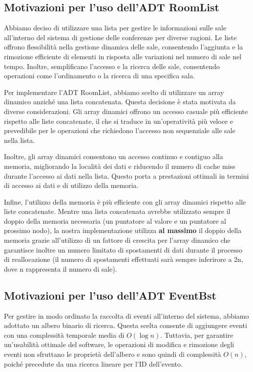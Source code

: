 \documentclass[11pt]{scrartcl} %
\begin{document}
\subsection{Motivazioni per l'uso dell'ADT RoomList}

Abbiamo deciso di utilizzare una lista per gestire le informazioni sulle sale all'interno del sistema di gestione delle conferenze per diverse ragioni. Le liste offrono flessibilità nella gestione dinamica delle sale, consentendo l'aggiunta e la rimozione efficiente di elementi in risposta alle variazioni nel numero di sale nel tempo. Inoltre, semplificano l'accesso e la ricerca delle sale, consentendo operazioni come l'ordinamento o la ricerca di una specifica sala.

Per implementare l'ADT RoomList, abbiamo scelto di utilizzare un array dinamico anziché una lista concatenata. Questa decisione è stata motivata da diverse considerazioni. Gli array dinamici offrono un accesso casuale più efficiente rispetto alle liste concatenate, il che si traduce in un'operatività più veloce e prevedibile per le operazioni che richiedono l'accesso non sequenziale alle sale nella lista.

Inoltre, gli array dinamici consentono un accesso continuo e contiguo alla memoria, migliorando la località dei dati e riducendo il numero di cache miss durante l'accesso ai dati nella lista. Questo porta a prestazioni ottimali in termini di accesso ai dati e di utilizzo della memoria.

Infine, l'utilizzo della memoria è più efficiente con gli array dinamici rispetto alle liste concatenate. Mentre una lista concatenata avrebbe utilizzato sempre il doppio della memoria necessaria (un puntatore al valore e un puntatore al prossimo nodo), la nostra implementazione utilizza \textbf{al massimo} il doppio della memoria grazie all'utilizzo di un fattore di crescita per l'array dinamico che garantisce inoltre un numero limitato di spostamenti di dati durante il processo di reallocazione (il numero di spostamenti effettuati sarà sempre inferirore a 2n, dove n rappresenta il numero di sale).


\subsection{Motivazioni per l'uso dell'ADT EventBst}
Per gestire in modo ordinato la raccolta di eventi all'interno del sistema, abbiamo adottato un albero binario di ricerca. Questa scelta consente di aggiungere eventi con una complessità temporale media di \( O(\log{n}) \). Tuttavia, per garantire un'usabilità ottimale del software, le operazioni di modifica e rimozione degli eventi non sfruttano le proprietà dell'albero e sono quindi di complessità \( O(n) \), poiché precedute da una ricerca lineare per l'ID dell'evento.
\end{document}
